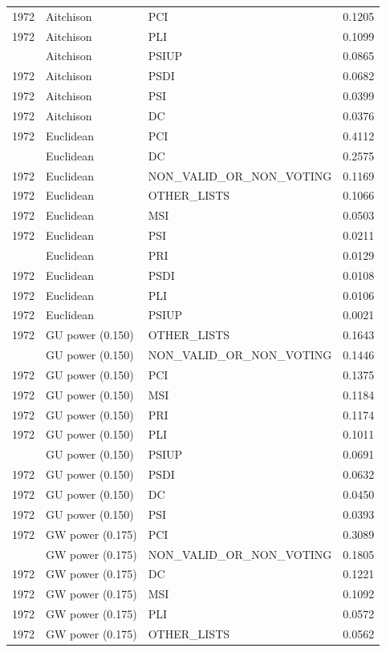 \begin{longtable}[t]{rllr}
1972 & Aitchison & PCI & 0.1205\\
1972 & Aitchison & PLI & 0.1099\\
\addlinespace
1972 & Aitchison & PSIUP & 0.0865\\
1972 & Aitchison & PSDI & 0.0682\\
1972 & Aitchison & PSI & 0.0399\\
1972 & Aitchison & DC & 0.0376\\
1972 & Euclidean & PCI & 0.4112\\
\addlinespace
1972 & Euclidean & DC & 0.2575\\
1972 & Euclidean & NON\_VALID\_OR\_NON\_VOTING & 0.1169\\
1972 & Euclidean & OTHER\_LISTS & 0.1066\\
1972 & Euclidean & MSI & 0.0503\\
1972 & Euclidean & PSI & 0.0211\\
\addlinespace
1972 & Euclidean & PRI & 0.0129\\
1972 & Euclidean & PSDI & 0.0108\\
1972 & Euclidean & PLI & 0.0106\\
1972 & Euclidean & PSIUP & 0.0021\\
1972 & GU power (0.150) & OTHER\_LISTS & 0.1643\\
\addlinespace
1972 & GU power (0.150) & NON\_VALID\_OR\_NON\_VOTING & 0.1446\\
1972 & GU power (0.150) & PCI & 0.1375\\
1972 & GU power (0.150) & MSI & 0.1184\\
1972 & GU power (0.150) & PRI & 0.1174\\
1972 & GU power (0.150) & PLI & 0.1011\\
\addlinespace
1972 & GU power (0.150) & PSIUP & 0.0691\\
1972 & GU power (0.150) & PSDI & 0.0632\\
1972 & GU power (0.150) & DC & 0.0450\\
1972 & GU power (0.150) & PSI & 0.0393\\
1972 & GW power (0.175) & PCI & 0.3089\\
\addlinespace
1972 & GW power (0.175) & NON\_VALID\_OR\_NON\_VOTING & 0.1805\\
1972 & GW power (0.175) & DC & 0.1221\\
1972 & GW power (0.175) & MSI & 0.1092\\
1972 & GW power (0.175) & PLI & 0.0572\\
1972 & GW power (0.175) & OTHER\_LISTS & 0.0562\\

\end{longtable}
